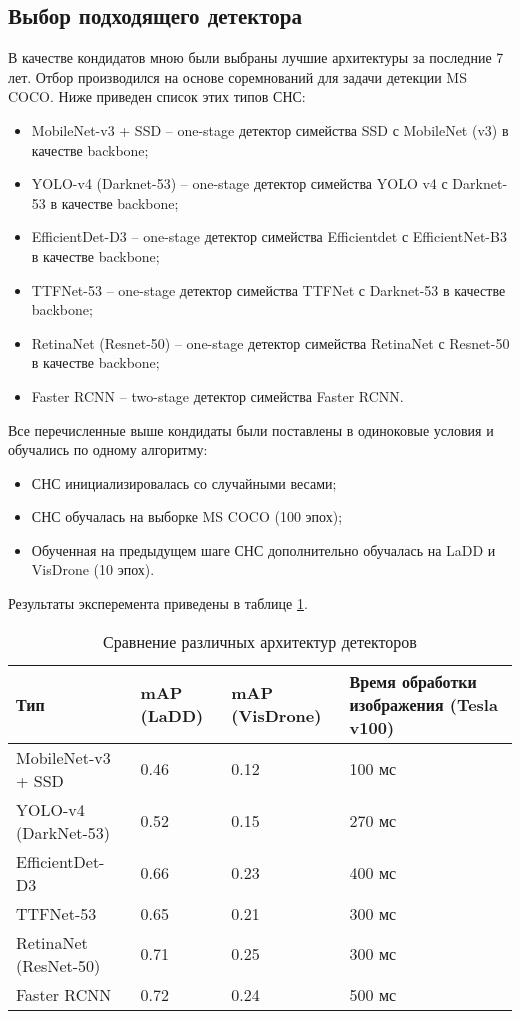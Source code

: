 \subsection{Выбор подходящего детектора}

В качестве кондидатов мною были выбраны лучшие архитектуры за последние 7 лет. Отбор производился на основе соремнований для задачи детекции MS COCO. Ниже приведен список этих типов СНС:
\begin{itemize}
    \item MobileNet-v3 + SSD -- one-stage детектор симейства SSD с MobileNet (v3) в качестве backbone;
    \item YOLO-v4 (Darknet-53) -- one-stage детектор симейства YOLO v4 с Darknet-53 в качестве backbone;
    \item EfficientDet-D3 -- one-stage детектор симейства Efficientdet с EfficientNet-B3 в качестве backbone;
    \item TTFNet-53 -- one-stage детектор симейства TTFNet с Darknet-53 в качестве backbone;
    \item RetinaNet (Resnet-50) -- one-stage детектор симейства RetinaNet с Resnet-50 в качестве backbone;
    \item Faster RCNN -- two-stage детектор симейства Faster RCNN.
\end{itemize}

Все перечисленные выше кондидаты были поставлены в одиноковые условия и обучались по одному алгоритму:
\begin{itemize}
    \item СНС инициализировалась со случайными весами;
    \item СНС обучалась на выборке MS COCO (100 эпох);
    \item Обученная на предыдущем шаге СНС дополнительно обучалась на LaDD и VisDrone (10 эпох).
\end{itemize}

Результаты эксперемента приведены в таблице \ref{leaderboard-table}.

\begin{table}[H]
    \caption{Сравнение различных архитектур детекторов}\label{leaderboard-table}
    \begin{tabular}{|p{4cm}|p{3cm}|p{3cm}|p{5cm}|}
    \hline
    {Тип} & {mAP (LaDD)} & {mAP (VisDrone)} & {Время обработки изображения (Tesla v100)} \\
    \hline
    MobileNet-v3 + SSD & 0.46 & 0.12 & 100 мс \\
    \hline
    YOLO-v4 (DarkNet-53) & 0.52 & 0.15 & 270 мс \\
    \hline
    EfficientDet-D3 & 0.66 & 0.23 & 400 мс \\
    \hline
    TTFNet-53 & 0.65 & 0.21 & 300 мс \\
    \hline
    RetinaNet (ResNet-50) & 0.71 & 0.25 & 300 мс \\
    \hline 
    Faster RCNN & 0.72 & 0.24 & 500 мс \\
    \hline
    \end{tabular}
  \end{table}

